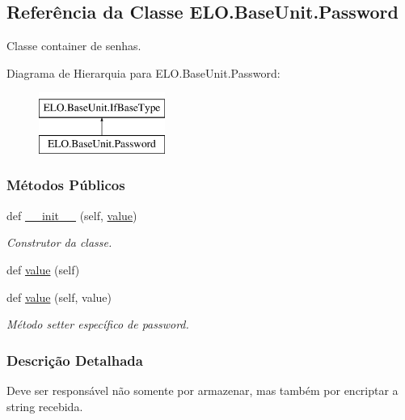 \hypertarget{classELO_1_1BaseUnit_1_1Password}{}\subsection{Referência da Classe E\+L\+O.\+Base\+Unit.\+Password}
\label{classELO_1_1BaseUnit_1_1Password}


Classe container de senhas.  


Diagrama de Hierarquia para E\+L\+O.\+Base\+Unit.\+Password\+:\begin{figure}[H]
\begin{center}
\leavevmode
\includegraphics[height=2.000000cm]{d4/df5/classELO_1_1BaseUnit_1_1Password}
\end{center}
\end{figure}
\subsubsection*{Métodos Públicos}
\begin{DoxyCompactItemize}
\item 
def \hyperlink{classELO_1_1BaseUnit_1_1Password_a106b381037a9e99506db3f910eca1276}{\+\_\+\+\_\+init\+\_\+\+\_\+} (self, \hyperlink{classELO_1_1BaseUnit_1_1Password_a6fc2a1e298a82e38701e8bf236a06d0e}{value})
\begin{DoxyCompactList}\small\item\em Construtor da classe. \end{DoxyCompactList}\item 
def \hyperlink{classELO_1_1BaseUnit_1_1Password_a6fc2a1e298a82e38701e8bf236a06d0e}{value} (self)
\item 
def \hyperlink{classELO_1_1BaseUnit_1_1Password_ad755afa2fa3666d80e5ddb046e612254}{value} (self, value)
\begin{DoxyCompactList}\small\item\em Método setter específico de password. \end{DoxyCompactList}\end{DoxyCompactItemize}


\subsubsection{Descrição Detalhada}
Deve ser responsável não somente por armazenar, mas também por encriptar a string recebida. 

